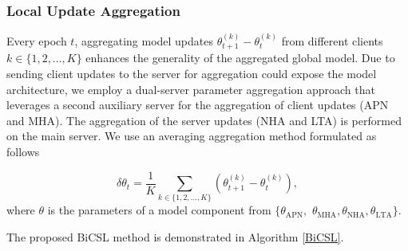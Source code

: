 \documentclass[letterpaper]{article} %
\begin{document}
\subsubsection{Local Update Aggregation}
Every epoch $t$, aggregating model updates $\theta_{t+1}^{(k)}-\theta_t^{(k)}$ from different clients $k\in \{1,2,\dots,K\}$ enhances the generality of the aggregated global model. Due to sending client updates to the server for aggregation could expose the model architecture, we employ a dual-server parameter aggregation approach that leverages a second auxiliary server for the aggregation of client updates (APN and MHA). The aggregation of the server updates (NHA and LTA) is performed on the main server. We use an averaging aggregation method formulated as follows

\begin{equation}
 \delta \theta_{t} = \frac{1}{K}\underset{k\in \{1,2,\dots,K\}}{\sum}(\theta_{t+1}^{(k)}-\theta_t^{(k)}),  
\end{equation}
where $\theta$ is the parameters of a model component from $\{\theta_{\text{APN}},$ 
$ \theta_{\text{MHA}}, \theta_{\text{NHA}}, \theta_{\text{LTA}}\}$. 

The proposed BiCSL method is demonstrated in Algorithm \ref{BiCSL}. 
\end{document}
